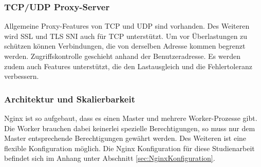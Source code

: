 \subsubsection{TCP/UDP Proxy-Server}
\label{sec:NginxTCP/UDP Proxy-Server}
Allgemeine Proxy-Features von TCP und UDP sind vorhanden. Des Weiteren wird SSL und TLS SNI auch für TCP unterstützt.
Um vor Überlastungen zu schützen können Verbindungen, die von derselben Adresse kommen begrenzt werden. Zugriffskontrolle geschieht anhand der Benutzeradresse. Es werden zudem auch Features unterstützt, die den Lastausgleich und die Fehlertoleranz verbessern.

\subsubsection{Architektur und Skalierbarkeit}
\label{sec:NginxArchitektur und Skalierbarkeit}
Nginx ist so aufgebaut, dass es einen Master und mehrere Worker-Prozesse gibt. Die Worker brauchen dabei keinerlei spezielle Berechtigungen, so muss nur dem Master entsprechende Berechtigungen gewährt werden. Des Weiteren ist eine flexible Konfiguration möglich. Die Nginx Konfiguration für diese Studienarbeit befindet sich im Anhang unter Abschnitt \ref {sec:NginxKonfiguration}.
